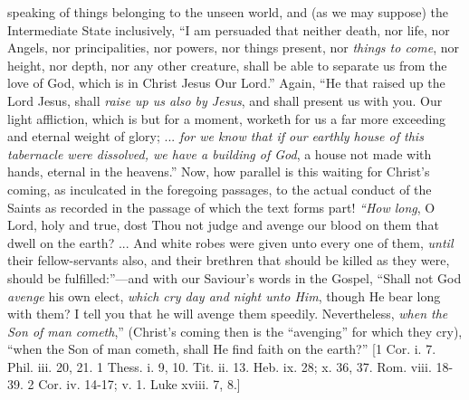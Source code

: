 speaking of things belonging to the unseen world, and (as we may
suppose) the Intermediate State inclusively, ``I am persuaded that
neither death, nor life, nor Angels, nor principalities, nor powers,
nor things present, nor \emph{things to come}, nor height, nor depth,
nor any other creature, shall be able to separate us from the love of
God, which is in Christ Jesus Our Lord.'' Again, ``He that
raised up the Lord Jesus, shall \emph{raise up us also by Jesus}, and
shall present us with you. Our light affliction, which is but for a
moment, worketh for us a far more exceeding and eternal weight of
glory; ... \emph{for we know that if our earthly house of this tabernacle
were dissolved, we have a building of God}, a house not made with
hands, eternal in the heavens.'' Now, how parallel is this waiting
for Christ's coming, as inculcated in the foregoing passages, to the
actual conduct of the Saints as recorded in the passage of which the
text forms part! \emph{``How long}, O Lord, holy and true, dost
Thou not judge and avenge our blood on them that dwell on the earth?
... And white robes were given unto every one of them, \emph{until}
their fellow-servants also, and their brethren that should be killed
as they were, should be fulfilled:''—and with our Saviour's
words in the Gospel, ``Shall not God \emph{avenge} his own elect, \emph{which
cry day and night unto Him}, though He bear long with them? I tell
you that he will avenge them speedily. Nevertheless, \emph{when the Son
of man cometh},'' (Christ's coming then is the
``avenging'' for which they cry), ``when the Son of man
cometh, shall He find faith on the earth?'' [1 Cor. i. 7. Phil.
iii. 20, 21. 1 Thess. i. 9, 10. Tit. ii. 13. Heb. ix. 28; x. 36, 37.
Rom. viii. 18-39. 2 Cor. iv. 14-17; v. 1. Luke xviii. 7, 8.]

